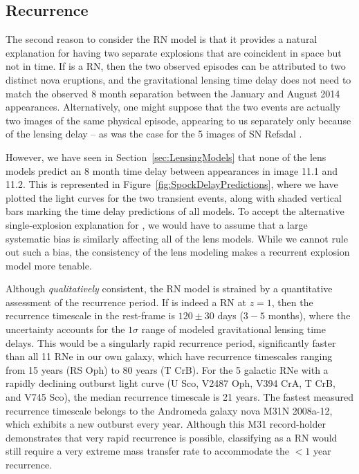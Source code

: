 \subsection{Recurrence}

The second reason to consider the RN model is that it provides a
natural explanation for having two separate explosions that are
coincident in space but not in time.  If \spock is a RN, then the two
observed episodes can be attributed to two distinct nova eruptions,
and the gravitational lensing time delay does not need to match the
observed 8 month separation between the January and August 2014
appearances.  Alternatively, one might suppose that the two \spock
events are actually two images of the same physical episode, appearing
to us separately only because of the lensing delay -- as was the case
for the 5 images of SN Refsdal \citep{Kelly:2015a,Kelly:2016}.

However, we have seen in Section~\ref{sec:LensingModels} that none of
the  lens models predict an 8 month time delay between
appearances in image 11.1 and 11.2.  This is represented in
Figure~\ref{fig:SpockDelayPredictions}, where we have plotted the
light curves for the two transient events, along with shaded vertical
bars marking the time delay predictions of all models.
To accept the alternative single-explosion explanation
for \spock, we would have to assume that a large systematic bias is
similarly affecting all of the lens models.  While we cannot rule out
such a bias, the consistency of the lens modeling makes a recurrent
explosion model more tenable.

Although {\it qualitatively} consistent, the RN model is strained by a
quantitative assessment of the recurrence period. If \spock is indeed
a RN at $z=1$, then the recurrence timescale in the rest-frame is
$120\pm30$ days ($3-5$ months), where the uncertainty accounts for the
$1\sigma$ range of modeled gravitational lensing time delays.  This
would be a singularly rapid recurrence period, significantly faster
than all 11 RNe in our own galaxy, which have recurrence timescales
ranging from 15 years (RS Oph) to 80 years (T CrB). For the 5 galactic
RNe with a rapidly declining outburst light curve (U Sco, V2487 Oph,
V394 CrA, T CrB, and V745 Sco), the median recurrence timescale is 21
years.  The fastest measured recurrence timescale belongs to the
Andromeda galaxy nova M31N 2008a-12, which exhibits a new outburst
every year. Although this M31 record-holder demonstrates that very
rapid recurrence is possible, classifying \spock as a RN would still
require a very extreme mass transfer rate to accommodate the $<1$ year
recurrence.

